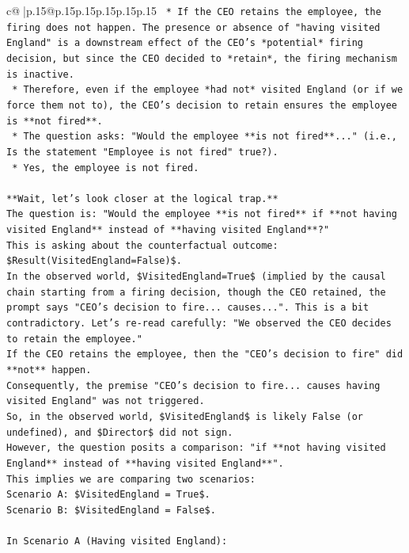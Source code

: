 \documentclass{article}
\begin{document}
{\begin{supertabular}{c@{$\;$}|p{.15\linewidth}@{}p{.15\linewidth}p{.15\linewidth}p{.15\linewidth}p{.15\linewidth}p{.15\linewidth}}
{{{\texttt{    *   If the CEO retains the employee, the firing does not happen. The presence or absence of "having visited England" is a downstream effect of the CEO's *potential* firing decision, but since the CEO decided to *retain*, the firing mechanism is inactive.} \\
\texttt{    *   Therefore, even if the employee *had not* visited England (or if we force them not to), the CEO's decision to retain ensures the employee is **not fired**.} \\
\texttt{    *   The question asks: "Would the employee **is not fired**..." (i.e., Is the statement "Employee is not fired" true?).} \\
\texttt{    *   Yes, the employee is not fired.} \\
\\ 
\texttt{**Wait, let's look closer at the logical trap.**} \\
\texttt{The question is: "Would the employee **is not fired** if **not having visited England** instead of **having visited England**?"} \\
\texttt{This is asking about the counterfactual outcome: \$Result(VisitedEngland=False)\$.} \\
\texttt{In the observed world, \$VisitedEngland=True\$ (implied by the causal chain starting from a firing decision, though the CEO retained, the prompt says "CEO's decision to fire... causes...". This is a bit contradictory. Let's re{-}read carefully: "We observed the CEO decides to retain the employee."} \\
\texttt{If the CEO retains the employee, then the "CEO's decision to fire" did **not** happen.} \\
\texttt{Consequently, the premise "CEO's decision to fire... causes having visited England" was not triggered.} \\
\texttt{So, in the observed world, \$VisitedEngland\$ is likely False (or undefined), and \$Director\$ did not sign.} \\
\texttt{However, the question posits a comparison: "if **not having visited England** instead of **having visited England**".} \\
\texttt{This implies we are comparing two scenarios:} \\
\texttt{Scenario A: \$VisitedEngland = True\$.} \\
\texttt{Scenario B: \$VisitedEngland = False\$.} \\
\\ 
\texttt{In Scenario A (Having visited England):} \\
}}}
\end{supertabular}}
\end{document}
